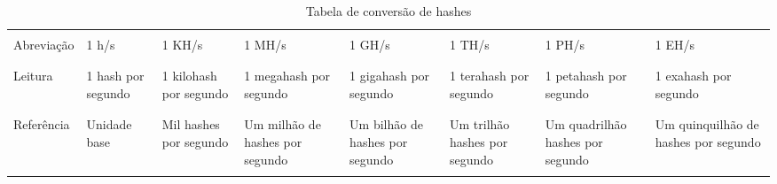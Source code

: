 \begin{table}[H] \label{hashtable}
	\centering
	\begin{tabular}{|l|p{16mm}|p{16mm}|p{16mm}|p{16mm}|p{16mm}|p{16mm}|p{16mm}|} 
			
		\hline
		&&&&&&&\\
		Abreviação & 1 h/s & 1 KH/s & 1 MH/s & 1 GH/s & 1 TH/s & 1 PH/s & 1 EH/s \\
		&&&&&&&\\
		\hline
		&&&&&&&\\
		Leitura & 1 hash por segundo & 1 kilohash por segundo & 1 megahash por segundo & 1 gigahash por segundo & 1 terahash por segundo & 1 petahash por segundo & 1 exahash por segundo \\
		&&&&&&&\\
		\hline
		&&&&&&&\\
		Referência & Unidade base & %
		Mil hashes por segundo & %
		Um milhão de hashes por segundo & %
		Um bilhão de hashes por segundo & %
		Um trilhão hashes por segundo & %
		Um quadrilhão hashes por segundo & %
		Um quinquilhão de hashes por segundo \\
		&&&&&&&\\
		\hline
	\end{tabular}
\caption{Tabela de conversão de hashes}
\end{table}


